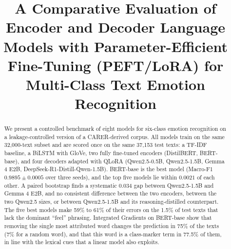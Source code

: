 \documentclass[conference]{IEEEtran}
\begin{document}
\title{A Comparative Evaluation of Encoder and Decoder Language Models with Parameter-Efficient Fine-Tuning (PEFT/LoRA) 
for Multi-Class Text Emotion Recognition
}

\author{
\and
{}
\and
{}
}

\maketitle

\begin{abstract}
We present a controlled benchmark of eight models for six-class emotion recognition on a leakage-controlled version of a CARER-derived corpus. All models train on the same 32,000-text subset and are scored once on the same 37,153 test texts: a TF-IDF baseline, a BiLSTM with GloVe, two fully fine-tuned encoders (DistilBERT, BERT-base), and four decoders adapted with QLoRA (Qwen2.5-0.5B, Qwen2.5-1.5B, Gemma 4 E2B, DeepSeek-R1-Distill-Qwen-1.5B). BERT-base is the best model (Macro-F1 $0.9895 \pm 0.0005$ over three seeds), and the top five models lie within $0.0021$ of each other. A paired bootstrap finds a systematic $0.034$ gap between Qwen2.5-1.5B and Gemma 4 E2B, and no consistent difference between the two encoders, between the two Qwen2.5 sizes, or between Qwen2.5-1.5B and its reasoning-distilled counterpart. The five best models make 59\% to 61\% of their errors on the 1.5\% of test texts that lack the dominant ``feel'' phrasing. Integrated Gradients on BERT-base show that removing the single most attributed word changes the prediction in 75\% of the texts (7\% for a random word), and that this word is a class-marker term in 77.5\% of them, in line with the lexical cues that a linear model also exploits.
\end{abstract}
\end{document}
